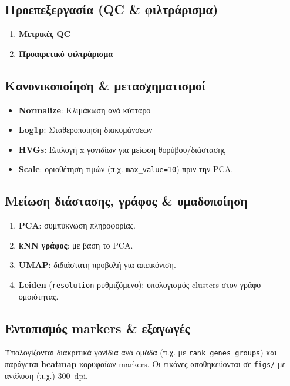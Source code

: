 \documentclass[12pt,a4paper]{article}
\begin{document}
\subsection{Προεπεξεργασία (QC \& φιλτράρισμα)}
\begin{enumerate}[leftmargin=*]
  \item \textbf{Μετρικές QC}
  \item \textbf{Προαιρετικό φιλτράρισμα}
\end{enumerate}

\subsection{Κανονικοποίηση \& μετασχηματισμοί}
\begin{itemize}
  \item \textbf{Normalize}: Κλιμάκωση ανά κύτταρο
  \item \textbf{Log1p}: Σταθεροποίηση διακυμάνσεων
  \item \textbf{HVGs}: Επιλογή x γονιδίων για μείωση θορύβου/διάστασης
  \item \textbf{Scale}: οριοθέτηση τιμών (π.χ. \texttt{max\_value=10}) πριν την PCA.
\end{itemize}

\subsection{Μείωση διάστασης, γράφος \& ομαδοποίηση}
\begin{enumerate}[leftmargin=*]
  \item \textbf{PCA}: συμπύκνωση πληροφορίας.
  \item \textbf{kNN γράφος}: με βάση το PCA.
  \item \textbf{UMAP}: διδιάστατη προβολή για απεικόνιση.
  \item \textbf{Leiden} (\texttt{resolution} ρυθμιζόμενο): υπολογισμός clusters στον γράφο ομοιότητας.
\end{enumerate}

\subsection{Εντοπισμός markers \& εξαγωγές}
Υπολογίζονται διακριτικά γονίδια ανά ομάδα (π.χ. με \texttt{rank\_genes\_groups}) και παράγεται \textbf{heatmap} κορυφαίων markers. Οι εικόνες αποθηκεύονται σε \texttt{figs/} με ανάλυση (π.χ.) 300~dpi.
\end{document}
